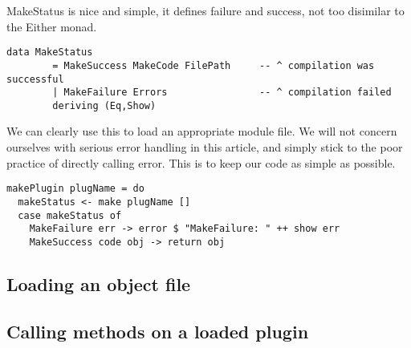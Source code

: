 \documentclass{article}
\begin{document}
MakeStatus is nice and simple, it defines failure and success, not too disimilar to the Either monad.

\begin{lstlisting}
data MakeStatus 
        = MakeSuccess MakeCode FilePath     -- ^ compilation was successful
        | MakeFailure Errors                -- ^ compilation failed
        deriving (Eq,Show)
\end{lstlisting}

We can clearly use this to load an appropriate module file. We will not concern ourselves with serious error handling in this article, and simply stick to the poor practice of directly calling error. This is to keep our code as simple as possible.

\begin{lstlisting}
makePlugin plugName = do 
  makeStatus <- make plugName []
  case makeStatus of
    MakeFailure err -> error $ "MakeFailure: " ++ show err
    MakeSuccess code obj -> return obj
\end{lstlisting}

\subsection{Loading an object file}

\subsection{Calling methods on a loaded plugin}

\end{document}
